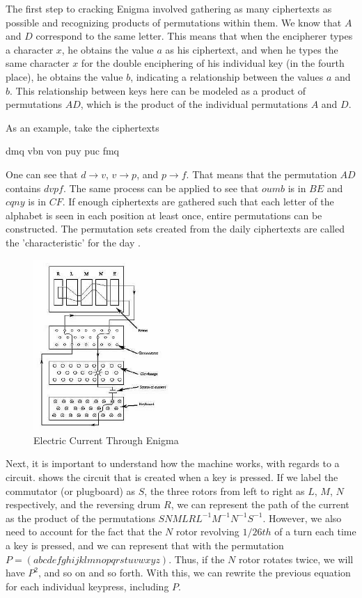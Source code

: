 The first step to cracking Enigma involved gathering as many ciphertexts as possible and recognizing products of permutations within them. We know that $A$ and $D$ correspond to the same letter. This means that when the encipherer types a character $x$, he obtains the value $a$ as his ciphertext, and when he types the same character $x$ for the double enciphering of his individual key (in the fourth place), he obtains the value $b$, indicating a relationship between the values $a$ and $b$. This relationship between keys here can be modeled as a product of permutations $AD$, which is the product of the individual permutations $A$ and $D$.

As an example, take the ciphertexts

\begin{CVerbatim}[fontsize=\small]
dmq vbn
von puy
puc fmq
\end{CVerbatim}

One can see that $d \rightarrow v$, $v \rightarrow p$, and $p \rightarrow f$. That means that the permutation $AD$ contains $dvpf$. The same process can be applied to see that $oumb$ is in $BE$ and $cqny$ is in $CF$. If enough ciphertexts are gathered such that each letter of the alphabet is seen in each position at least once, entire permutations can be constructed. The permutation sets created from the daily ciphertexts are called the 'characteristic' for the day \cite{wk85}.

\begin{figure}[h!]
\begin{centering}
  \includegraphics[height=6.5cm]{images/permutations.jpg}
  \caption{Electric Current Through Enigma}
  \label{fig:current1}
\end{centering}
\end{figure}

Next, it is important to understand how the machine works, with regards to a circuit.  shows the circuit that is created when a key is pressed. If we label the commutator (or plugboard) as $S$, the three rotors from left to right as $L$, $M$, $N$ respectively, and the reversing drum $R$, we can represent the path of the current as the product of the permutations $SNMLRL^{-1}M^{-1}N^{-1}S^{-1}$. However, we also need to account for the fact that the $N$ rotor revolving $1/26th$ of a turn each time a key is pressed, and we can represent that with the permutation $P = (abcdefghijklmnopqrstuvwxyz)$. Thus, if the $N$ rotor rotates twice, we will have $P^2$, and so on and so forth. With this, we can rewrite the previous equation for each individual keypress, including $P$.

